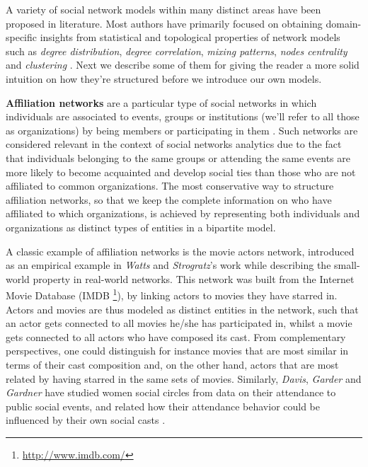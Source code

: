 A variety of social network models within many distinct areas have been proposed in literature.
Most authors have primarily focused on obtaining domain-specific insights from statistical and topological properties of network models such as \textit{degree distribution}, \textit{degree correlation}, \textit{mixing patterns}, \textit{nodes centrality} and \textit{clustering} \cite{Newman2003b}.
Next we describe some of them for giving the reader a more solid intuition on how they're structured before we introduce our own models.


\textbf{Affiliation networks} are a particular type of social networks in which individuals are associated to events, groups or institutions (we'll refer to all those as organizations) by being members or participating in them \cite{Borgatti2015}. 
%
Such networks are considered relevant in the context of social networks analytics due to the fact that individuals belonging to the same groups or attending the same events are more likely to become acquainted and develop social ties than those who are not affiliated to common organizations.
%
The most conservative way to structure affiliation networks, so that we keep the complete information on who have affiliated to which organizations, is achieved by representing both individuals and organizations as distinct types of entities in a bipartite model.
 
A classic example of affiliation networks is the movie actors network, introduced as an empirical example in \textit{Watts} and \textit{Strogratz}'s work \cite{Watts1998} while describing the small-world property in real-world networks.
This network was built from the Internet Movie Database (IMDB \footnote{\url{http://www.imdb.com/}}), by linking actors to movies they have starred in.
Actors and movies are thus modeled as distinct entities in the network, such that an actor gets connected to all movies he/she has participated in, whilst a movie gets connected to all actors who have composed its cast.  
From complementary perspectives, one could distinguish for instance movies that are most similar in terms of their cast composition and, on the other hand, actors that are most related by having starred in the same sets of movies.
%
Similarly, \textit{Davis}, \textit{Garder} and \textit{Gardner} have studied women social circles from data on their attendance to public social events, and related how their attendance behavior could be influenced by their own social casts \cite{Davis1941a}. 

